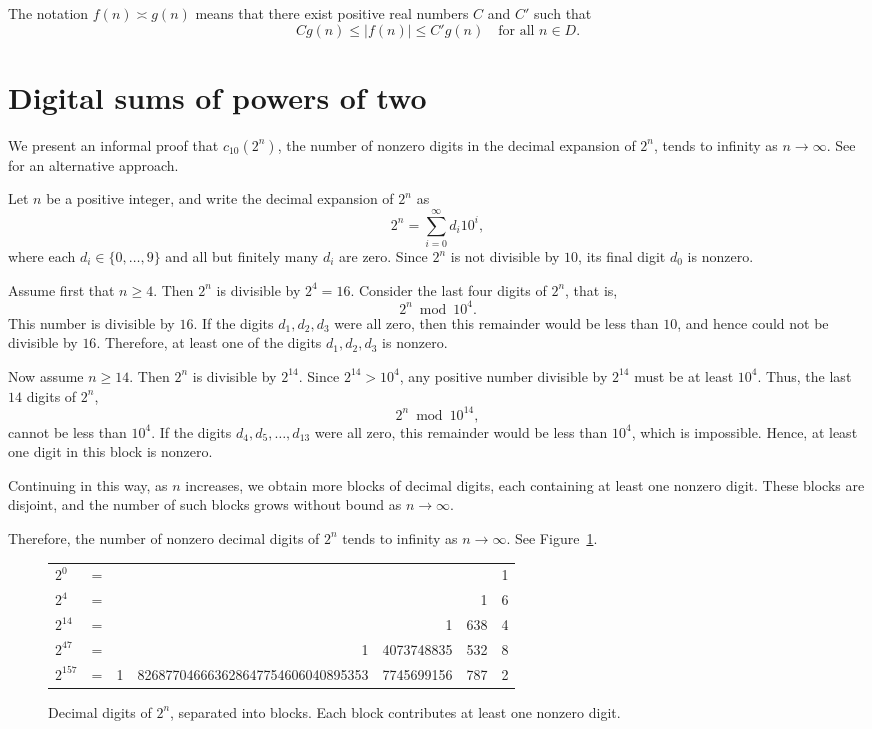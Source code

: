 \documentclass[12pt]{amsart}
\theoremstyle{remark}
\begin{document}
The notation $f(n) \asymp g(n)$ means that there exist positive real numbers $C$ and $C'$ such that
\[
    C g(n) \le |f(n)| \le C' g(n) \quad \text{for all } n \in D.
\]

\section{Digital sums of powers of two} \label{sec:powers-of-two}
We present an informal proof that $c_{10}(2^n)$, the number of nonzero digits
in the decimal expansion of $2^n$, tends to infinity as $n \to \infty$.
See~\cite{radcliffe2016} for an alternative approach.

Let $n$ be a positive integer, and write the decimal expansion of $2^n$ as
\[
    2^n = \sum_{i=0}^{\infty} d_i 10^i,
\]
where each $d_i \in \{0,\dots,9\}$ and all but finitely many $d_i$ are zero.
Since $2^n$ is not divisible by $10$, its final digit $d_0$ is nonzero.

Assume first that $n \ge 4$. Then $2^n$ is divisible by $2^4 = 16$.
Consider the last four digits of $2^n$, that is,
\[
    2^n \bmod 10^4.
\]
This number is divisible by $16$. If the digits $d_1,d_2,d_3$ were all zero,
then this remainder would be less than $10$, and hence could not be divisible
by $16$. Therefore, at least one of the digits $d_1,d_2,d_3$ is nonzero.

Now assume $n \ge 14$. Then $2^n$ is divisible by $2^{14}$.
Since $2^{14} > 10^4$, any positive number divisible by $2^{14}$
must be at least $10^4$. Thus, the last $14$ digits of $2^n$,
\[
    2^n \bmod 10^{14},
\]
cannot be less than $10^4$.
If the digits $d_4,d_5,\dots,d_{13}$ were all zero, this remainder would be
less than $10^4$, which is impossible. Hence, at least one digit in this block
is nonzero.

Continuing in this way, as $n$ increases, we obtain more blocks of decimal
digits, each containing at least one nonzero digit.
These blocks are disjoint, and the number of such blocks grows without
bound as $n \to \infty$.

Therefore, the number of nonzero decimal digits of $2^n$ tends to infinity as
$n \to \infty$. See Figure~\ref{fig:blocks}.

\begin{figure}
    \begin{tabular}{lcrrrrr}
        $2^0$     & = &   &                                   &            &     & 1 \\
        $2^4$     & = &   &                                   &            & 1   & 6 \\
        $2^{14}$  & = &   &                                   & 1          & 638 & 4 \\
        $2^{47}$  & = &   & 1                                 & 4073748835 & 532 & 8 \\
        $2^{157}$ & = & 1 & 826877046663628647754606040895353 & 7745699156 & 787 & 2
    \end{tabular}
    \caption{Decimal digits of $2^n$, separated into blocks.
        Each block contributes at least one nonzero digit.}
    \label{fig:blocks}
\end{figure}
\end{document}
